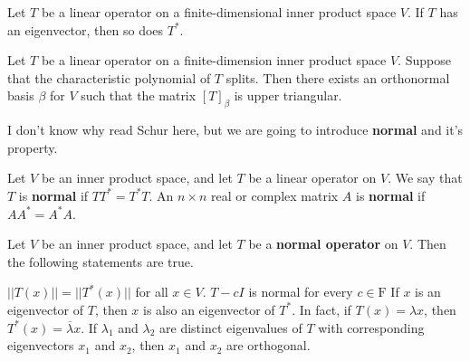 \begin{lmma*}
	Let $T$ be a linear operator on a finite-dimensional inner product space $V$. If $T$ has an eigenvector, then so does $T^*$.
\end{lmma*}

\begin{thm*}[Schur]
	Let $T$ be a linear operator on a finite-dimension inner product space $V$. Suppose that the characteristic polynomial of $T$ splits. Then there exists an orthonormal basis $\beta$ for $V$ such that the matrix $[T]_\beta$ is upper triangular.
\end{thm*}

\begin{tcolorbox}
	I don't know why read Schur here, but we are going to introduce \textbf{normal} and it's property.
\end{tcolorbox}

\begin{defn}
	Let $V$ be an inner product space, and let $T$ be a linear operator on $V$. We say that $T$ is \textbf{normal} if $TT^* = T^*T$. An $n \times n$ real or complex matrix $A$ is \textbf{normal} if $AA^* = A^*A$.
\end{defn}


\begin{thm*}
	Let $V$ be an inner product space, and let $T$ be a \textbf{normal operator} on $V$. Then the following statements are true.
	
	\begin{tasks}
		\task $||T(x)|| = ||T^*(x)||$ for all $x \in V$.
		\task $T - cI$ is normal for every $c \in \mathrm F$
		\task If $x$ is an eigenvector of $T$, then $x$ is also an eigenvector of $T^*$. In fact, if $T(x) = \lambda x$, then $T^*(x) = \overline{\lambda}x$.
		\task If $\lambda_1$ and $\lambda_2$ are distinct eigenvalues of $T$ with corresponding eigenvectors $x_1$ and $x_2$, then $x_1$ and $x_2$ are orthogonal.
	\end{tasks}
\end{thm*}



















